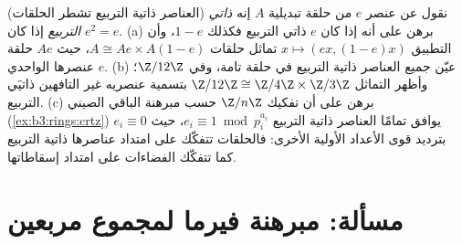 \begin{exercise}[$\star\star$]\label{exo:b3:rings:12}
(العناصر ذاتية التربيع تشطر الحلقات) نقول عن عنصر $e$ من حلقة
تبديلية $A$ إنه \emph{ذاتي التربيع} إذا كان $e^2 = e$.
(a) برهن على أنه إذا كان $e$ ذاتي التربيع فكذلك $1 - e$، وأن
التطبيق $x \mapsto (ex, (1-e)x)$ تماثل حلقات $A
\cong Ae \times A(1-e)$، حيث $Ae$ حلقة عنصرها
الواحدي $e$.
(b) عيّن جميع العناصر ذاتية التربيع في حلقة تامة، وفي
$\Z/12\Z$؛ وأظهر التماثل $\Z/12\Z \cong \Z/4\Z \times \Z/3\Z$ بتسمية عنصريه غير التافهين
ذاتيَي التربيع.
(c) برهن على أن تفكيك $\Z/n\Z$ حسب مبرهنة الباقي الصيني
(\cref{ex:b3:rings:crtz}) يوافق تمامًا العناصر ذاتية التربيع $e_i \equiv 1 \bmod p_i^{a_i}$، حيث
$e_i \equiv 0$ بترديد قوى الأعداد الأولية الأخرى: فالحلقات
تتفكّك على امتداد عناصرها ذاتية التربيع كما تتفكّك الفضاءات على
امتداد إسقاطاتها.
\end{exercise}

\section{مسألة: مبرهنة فيرما لمجموع مربعين}

